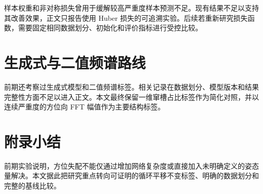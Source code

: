 样本权重和非对称损失曾用于缓解较高严重度样本预测不足。现有结果不足以支持其改善效果，正文只报告使用 Huber 损失的可追溯实验。后续若重新研究损失函数，需要固定相同数据划分、初始化和评价指标进行受控比较。

\section{生成式与二值频谱路线}

前期还考察过生成式模型和二值频谱标签。相关记录在数据划分、模型版本和结果完整性方面不足以进入正文。本文最终保留一维窜槽占比标签作为简化对照，并以连续严重度的方位向 FFT 幅值作为主要结构标签。

\section{附录小结}

前期实验说明，方位失配不能仅通过增加网络复杂度或直接加入未明确定义的姿态量解决。本文据此把研究重点转向可证明的循环平移不变标签、明确的数据划分和完整的基线比较。
